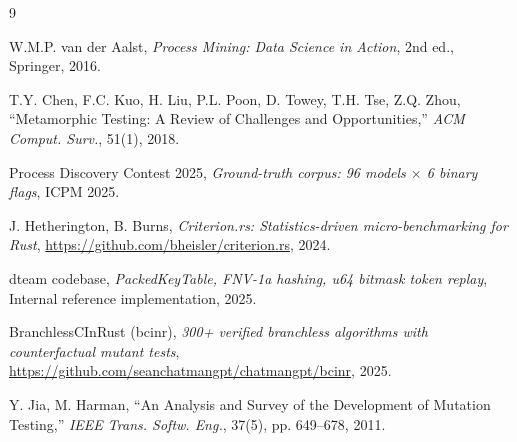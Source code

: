 \documentclass[12pt,a4paper]{article}
\begin{document}
\begin{thebibliography}{9}

  W.M.P. van der Aalst,
  \emph{Process Mining: Data Science in Action},
  2nd ed., Springer, 2016.

  T.Y. Chen, F.C. Kuo, H. Liu, P.L. Poon, D. Towey, T.H. Tse, Z.Q. Zhou,
  ``Metamorphic Testing: A Review of Challenges and Opportunities,''
  \emph{ACM Comput. Surv.}, 51(1), 2018.

  Process Discovery Contest 2025,
  \emph{Ground-truth corpus: 96 models $\times$ 6 binary flags},
  ICPM 2025.

  J. Hetherington, B. Burns,
  \emph{Criterion.rs: Statistics-driven micro-benchmarking for Rust},
  \url{https://github.com/bheisler/criterion.rs}, 2024.

  dteam codebase,
  \emph{PackedKeyTable, FNV-1a hashing, u64 bitmask token replay},
  Internal reference implementation, 2025.

  BranchlessCInRust (bcinr),
  \emph{300+ verified branchless algorithms with counterfactual mutant tests},
  \url{https://github.com/seanchatmangpt/chatmangpt/bcinr}, 2025.

  Y. Jia, M. Harman,
  ``An Analysis and Survey of the Development of Mutation Testing,''
  \emph{IEEE Trans. Softw. Eng.}, 37(5), pp. 649--678, 2011.

\end{thebibliography}
\end{document}
